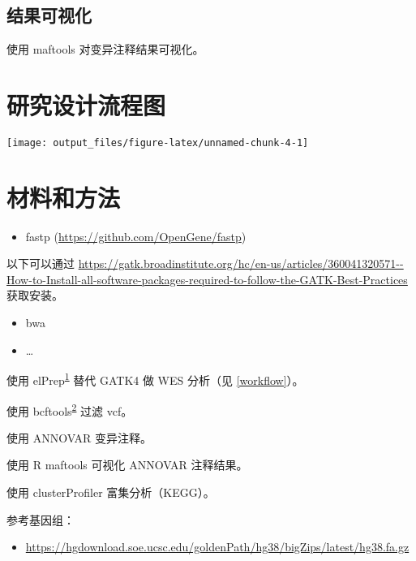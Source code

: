 \documentclass[
]{article}
\providecommand{\tightlist}{%
  \setlength{\itemsep}{0pt}\setlength{\parskip}{0pt}}
\begin{document}
\hypertarget{ux7ed3ux679cux53efux89c6ux5316}{%
\subsection{结果可视化}\label{ux7ed3ux679cux53efux89c6ux5316}}

使用 maftools 对变异注释结果可视化。

\hypertarget{route}{%
\section{研究设计流程图}\label{route}}

\texttt{[image: output\_files/figure-latex/unnamed-chunk-4-1]}

\hypertarget{methods}{%
\section{材料和方法}\label{methods}}

\begin{itemize}
\tightlist
\item
  fastp (\url{https://github.com/OpenGene/fastp})
\end{itemize}

以下可以通过 \url{https://gatk.broadinstitute.org/hc/en-us/articles/360041320571--How-to-Install-all-software-packages-required-to-follow-the-GATK-Best-Practices} 获取安装。

\begin{itemize}
\tightlist
\item
  bwa
\item
  \ldots{}
\end{itemize}

使用 elPrep\textsuperscript{\protect\hyperlink{ref-MultithreadedV2021}{1}} 替代 GATK4 做 WES 分析（见 \ref{workflow}）。

使用 bcftools\textsuperscript{\protect\hyperlink{ref-TwelveYearsOfDanece2021}{2}} 过滤 vcf。

使用 ANNOVAR 变异注释。

使用 R maftools 可视化 ANNOVAR 注释结果。

使用 clusterProfiler 富集分析（KEGG）。

参考基因组：

\begin{itemize}
\tightlist
\item
  \url{https://hgdownload.soe.ucsc.edu/goldenPath/hg38/bigZips/latest/hg38.fa.gz}
\end{itemize}
\end{document}
